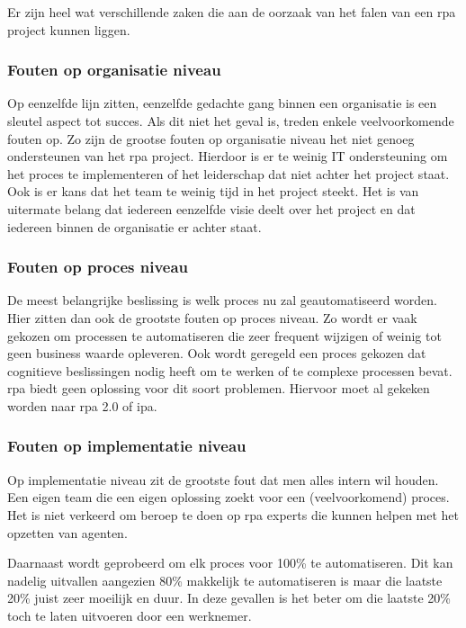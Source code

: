 Er zijn heel wat verschillende zaken die aan de oorzaak van het falen van een \acrshort{rpa} project kunnen liggen. \autocite{pitfallsRPA}

\subsubsection{Fouten op organisatie niveau}
Op eenzelfde lijn zitten, eenzelfde gedachte gang binnen een organisatie is een sleutel aspect tot succes. Als dit niet het geval is, treden enkele veelvoorkomende fouten op. Zo zijn de grootse fouten op organisatie niveau het niet genoeg ondersteunen van het \acrshort{rpa} project. Hierdoor is er te weinig IT ondersteuning om het proces te implementeren of het leiderschap dat niet achter het project staat. Ook is er kans dat het team te weinig tijd in het project steekt. Het is van uitermate belang dat iedereen eenzelfde visie deelt over het project en dat iedereen binnen de organisatie er achter staat. \autocite{pitfallsRPA}

\subsubsection{Fouten op proces niveau}
De meest belangrijke beslissing is welk proces nu zal geautomatiseerd worden. Hier zitten dan ook de grootste fouten op proces niveau. Zo wordt er vaak gekozen om processen te automatiseren die zeer frequent wijzigen of weinig tot geen business waarde opleveren. Ook wordt geregeld een proces gekozen dat cognitieve beslissingen nodig heeft om te werken of te complexe processen bevat. \acrshort{rpa} biedt geen oplossing voor dit soort problemen. Hiervoor moet al gekeken worden naar \acrshort{rpa} 2.0 of \acrshort{ipa}. \autocite{pitfallsRPA}

\subsubsection{Fouten op implementatie niveau}
Op implementatie niveau zit de grootste fout dat men alles intern wil houden. Een eigen team die een eigen oplossing zoekt voor een (veelvoorkomend) proces. Het is niet verkeerd om beroep te doen op \acrshort{rpa} experts die kunnen helpen met het opzetten van agenten. \autocite{pitfallsRPA}

Daarnaast wordt geprobeerd om elk proces voor 100\% te automatiseren. Dit kan nadelig uitvallen aangezien 80\% makkelijk te automatiseren is maar die laatste 20\% juist zeer moeilijk en duur. In deze gevallen is het beter om die laatste 20\% toch te laten uitvoeren door een werknemer. \autocite{pitfallsRPA}

